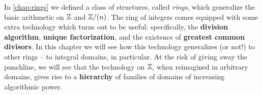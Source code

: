 In \autoref{chap:rings} we defined a class of structures, called \emph{rings}, which generalize the basic arithmetic on \(\mathbb{Z}\) and \(\mathbb{Z}/(n)\). The ring of integers comes equipped with some extra technology which turns out to be useful: specifically, the \textbf{division algorithm}, \textbf{unique factorization}, and the existence of \textbf{greatest common divisors}. In this chapter we will see how this technology generalizes (or not!) to other rings -- to integral domains, in particular. At the risk of giving away the punchline, we will see that the technology on \(\mathbb{Z}\), when reimagined in arbitrary domains, gives rise to a \textbf{hierarchy} of families of domains of increasing algorithmic power.
